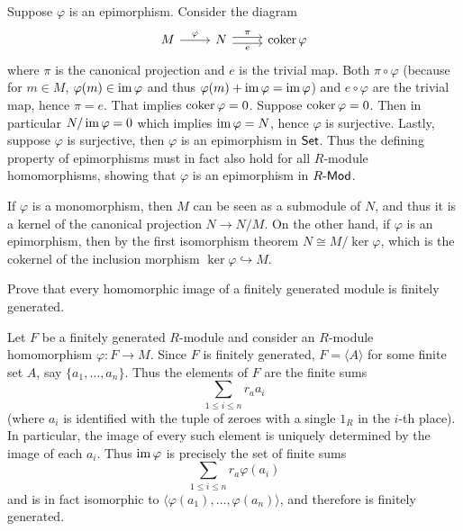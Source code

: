 \begin{solution}
	Suppose $\varphi$ is an epimorphism. Consider the diagram
	\begin{equation*}
		\begin{tikzcd}
			M
			\arrow[r, "\varphi"]
			& N
			\arrow[r, shift left, "\pi"]
			\arrow[r, shift right, "e"']
			& \coker \varphi
		\end{tikzcd}
	\end{equation*}
	where $\pi$ is the canonical projection and $e$ is the trivial map. Both $\pi \circ \varphi$ (because for $m \in M$, $\varphi(m) \in \operatorname{im} \varphi$ and thus $\varphi(m) + \operatorname{im} \varphi = \operatorname{im} \varphi$) and $e \circ \varphi$ are the trivial map, hence $\pi = e$. That implies $\operatorname{coker} \varphi = 0$. Suppose $\operatorname{coker} \varphi = 0$. Then in particular $N/\operatorname{im} \varphi = 0$ which implies $\operatorname{im} \varphi = N$, hence $\varphi$ is surjective. Lastly, suppose $\varphi$ is surjective, then $\varphi$ is an epimorphism in $\mathsf{Set}$. Thus the defining property of epimorphisms must in fact also hold for all $R$-module homomorphisms, showing that $\varphi$ is an epimorphism in $R\text{-}\mathsf{Mod}$.
	
	If $\varphi$ is a monomorphism, then $M$ can be seen as a submodule of $N$, and thus it is a kernel of the canonical projection $N \to N/M$. On the other hand, if $\varphi$ is an epimorphism, then by the first isomorphism theorem $N \cong M/\ker \varphi$, which is the cokernel of the inclusion morphism $\ker \varphi \hookrightarrow M$.
\end{solution}

\begin{problem}
	Prove that every homomorphic image of a finitely generated module is finitely generated.
\end{problem}

\begin{solution}
	Let $F$ be a finitely generated $R$-module and consider an $R$-module homomorphism $\varphi: F \to M$. Since $F$ is finitely generated, $F = \langle A \rangle$ for some finite set $A$, say $\{ a_1, \dots, a_n \}$. Thus the elements of $F$ are the finite sums
	\[
		\sum_{1 \leq i \leq n} r_a a_i
	\]
	(where $a_i$ is identified with the tuple of zeroes with a single $1_R$ in the $i$-th place). In particular, the image of every such element is uniquely determined by the image of each $a_i$. Thus $\operatorname{im} \varphi$ is precisely the set of finite sums
	\[
		\sum_{1 \leq i \leq n} r_a \varphi(a_i)
	\]
	and is in fact isomorphic to $\langle \varphi(a_1), \dots, \varphi(a_n) \rangle$, and therefore is finitely generated.
\end{solution}

